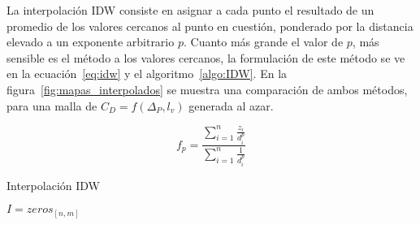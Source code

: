La interpolación IDW consiste en asignar a cada punto el resultado de un
promedio de los valores cercanos al punto en cuestión, ponderado por la
distancia elevado a un exponente arbitrario $p$.
%
Cuanto más grande el valor de $p$, más sensible es el método a los valores
cercanos, la formulación de este método se ve en la ecuación~\ref{eq:idw} y el
algoritmo~\ref{algo:IDW}.
%
En la figura~\ref{fig:mapas_interpolados} se muestra una comparación de ambos
métodos, para una malla de $C_{D}=f(\Delta_{P}, l_{v})$ generada al azar.

\begin{equation} \label{eq:idw}
    f_p = \frac{\sum_{i=1}^{n} \frac{z_i}{d_i^p}} {\sum_{i=1}^{n}
    \frac{1}{d_i^p}}
\end{equation}

\begin{algorithm}
    \caption{Interpolación IDW}\label{algo:IDW}


    \BlankLine
    $I=zeros_{[n,m]}$\;
\end{algorithm}

